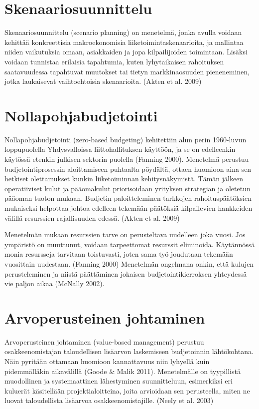 \documentclass[12pt,a4paper,oneside,pdftex]{report}
\begin{document}
\section{Skenaariosuunnittelu}

Skenaariosuunnittelu (scenario planning) on menetelmä, jonka avulla voidaan kehittää konkreettisia makroekonomisia liiketoimintaskenaarioita, ja mallintaa niiden vaikutuksia omaan, asiakkaiden ja jopa kilpailijoiden toimintaan. Lisäksi voidaan tunnistaa erilaisia tapahtumia, kuten lyhytaikaisen rahoituksen saatavuudessa tapahtuvat muutokset tai tietyn markkinaosuuden pieneneminen, jotka laukaisevat vaihtoehtoisia skenaarioita. (Akten et al. 2009)

\section{Nollapohjabudjetointi}

Nollapohjabudjetointi (zero-based budgeting) kehitettiin alun perin 1960-luvun loppupuolella Yhdysvalloissa liittohallituksen käyttöön, ja se on edelleenkin käytössä etenkin julkisen sektorin puolella (Fanning 2000). Menetelmä perustuu budjetointiprosessin aloittamiseen puhtaalta pöydältä, ottaen huomioon aina sen hetkiset olettamukset kunkin liiketoiminnan kehitysnäkymistä. Tämän jälkeen operatiiviset kulut ja pääomakulut priorisoidaan yrityksen strategian ja oletetun pääoman tuoton mukaan. Budjetin paloitteleminen tarkkojen rahoituspäätöksien mukaiseksi helpottaa johtoa edelleen tekemään päätöksiä kilpailevien hankkeiden välillä resurssien rajallisuuden edessä. (Akten et al. 2009)

Menetelmän mukaan resurssien tarve on perusteltava uudelleen joka vuosi. Jos ympäristö on muuttunut, voidaan tarpeettomat resurssit eliminoida. Käytännössä monia resursseja tarvitaan toistuvasti, joten sama työ joudutaan tekemään vuosittain uudestaan. (Fanning 2000) Menetelmän ongelmana onkin, että kulujen perusteleminen ja niistä päättäminen jokaisen budjetointikierroksen yhteydessä vie paljon aikaa (McNally 2002).

\section{Arvoperusteinen johtaminen}

Arvoperusteinen johtaminen (value-based management) perustuu osakkeenomistajan taloudellisen lisäarvon laskemiseen budjetoinnin lähtökohtana. Näin pyritään ottamaan huomioon kannattavuus niin lyhyellä kuin pidemmälläkin aikavälillä (Goode & Malik 2011). Menetelmälle on tyypillistä muodollinen ja systemaattinen lähestyminen suunnitteluun, esimerkiksi eri kuluerät käsitellään projektialoitteina, joita arvioidaan sen perusteella, miten ne luovat taloudellista lisäarvoa osakkeenomistajille. (Neely et al. 2003)
\end{document}
